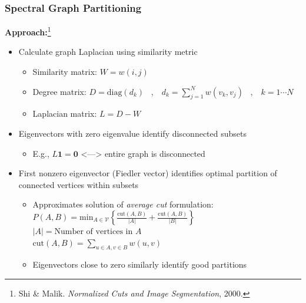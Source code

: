 \documentclass[9pt]{beamer}
\newcommand{\bv}[1]{\mathbf{#1}}
\begin{document}
\begin{frame}
\frametitle{Spectral Graph Partitioning}
\label{sec-3-17}

\textbf{Approach:}\footnote{Shi \& Malik. \emph{Normalized Cuts and Image Segmentation}, 2000.
 }
\begin{itemize}
\item Calculate graph Laplacian using similarity metric
\begin{itemize}
\item Similarity matrix: $W = w(i,j)$
\item Degree matrix: $D = \text{diag}(d_k) \;\;\; , \;\;\; d_k = \sum_{j=1}^N w(v_k,v_j) \;\;\; , \;\;\; k=1 \cdots N$
\item Laplacian matrix: $L = D - W$
\end{itemize}
\item Eigenvectors with zero eigenvalue identify disconnected subsets
\begin{itemize}
\item E.g., $L \bv{1} = \bv{0}$ <---> entire graph is disconnected
\end{itemize}
\item First nonzero eigenvector (Fiedler vector) identifies optimal
    partition of connected vertices within subsets
\begin{itemize}
\item Approximates solution of \emph{average cut} formulation: \\ 
$P(A,B) = \text{min}_{A \in \mathcal{V}} \left \lbrace \frac{\text{cut}(A,B)}{| A |} + \frac{\text{cut}(A,B)}{| B |} \right \rbrace$ \\
      $|A| = \text{Number of vertices in }A$ \\
      $\text{cut}(A,B) = \sum_{u \in A,v \in B} w(u,v)$
\item Eigenvectors close to zero similarly identify good partitions
\end{itemize}
\end{itemize}
\end{frame}
\end{document}
